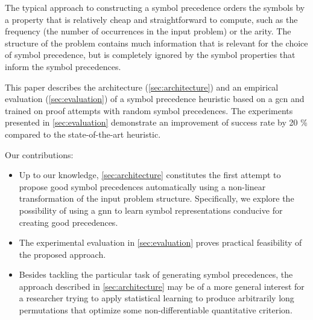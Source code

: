 The typical approach to constructing a symbol precedence orders the symbols by a property
that is relatively cheap and straightforward to compute,
such as the frequency (the number of occurrences in the input problem) \cite{E-manual} or the arity.
The structure of the problem contains much information that is relevant for the choice of symbol precedence,
but is completely ignored by the symbol properties that inform the symbol precedences.

This paper describes the architecture (\cref{sec:architecture}) and an empirical evaluation (\cref{sec:evaluation})
of a symbol precedence heuristic based on a \gls{gcn} \cite{kipf2017semisupervised}
and trained on proof attempts with random symbol precedences.
The experiments presented in \cref{sec:evaluation} demonstrate an improvement of success rate by 20 \%
compared to the state-of-the-art heuristic.


Our contributions:
\begin{itemize}
\item Up to our knowledge, \cref{sec:architecture} constitutes the first attempt
to propose good symbol precedences automatically using a non-linear transformation of the input problem structure.
Specifically, we explore the possibility of using a \gls{gnn} to learn symbol representations conducive for creating good precedences.
\item The experimental evaluation in \cref{sec:evaluation} proves practical feasibility of the proposed approach.
\item Besides tackling the particular task of generating symbol precedences,
the approach described in \cref{sec:architecture} may be of a more general interest
for a researcher trying to apply statistical learning to produce arbitrarily long permutations
that optimize some non-differentiable quantitative criterion.
\end{itemize}

